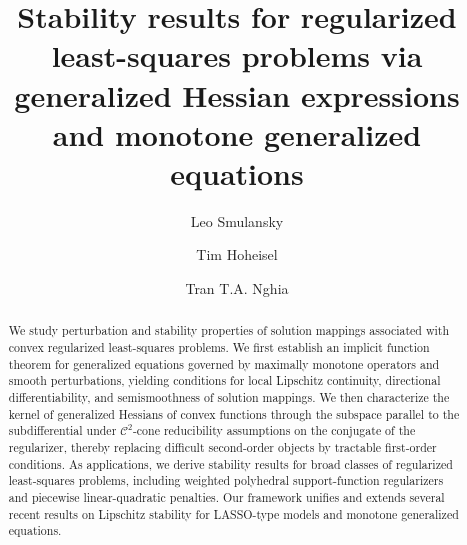 \documentclass[reqno]{amsart}
\numberwithin{equation}{section}
\begin{document}
\title[Stability results for regularized least-squares problems]{Stability results for regularized least-squares problems via  generalized Hessian expressions and monotone generalized equations}




\author{Leo Smulansky}
\address{
Department of Mathematics and Statistics\\
McGill University\\
Burnside Hall\\
805 Sherbrooke Street West\\
Montreal, Quebec H3A 0B9\\
Canada
}


\address{
Department of Mathematics and Statistics\\
McGill University\\
Burnside Hall, Room 1114\\
805 Sherbrooke Street West\\
Montreal, Quebec H3A 0B9\\
Canada
}

\author{Tim Hoheisel}

\author{Tran T.A. Nghia}
\address{
Department of Mathematics and Statistics\\
Oakland University\\
444 Mathematics and Science Center\\
Rochester, MI 48309\\
USA
}





\begin{abstract}
We study perturbation and stability properties of solution mappings associated with convex regularized least-squares problems. 
We first establish an implicit function theorem for generalized equations governed by maximally monotone operators and smooth perturbations, yielding conditions for local Lipschitz continuity, directional differentiability, and semismoothness of solution mappings. We then characterize the kernel of generalized Hessians of convex functions through the subspace parallel to the subdifferential under \(\mathcal{C}^2\)-cone reducibility assumptions  on the conjugate of the regularizer, thereby replacing difficult second-order objects by tractable first-order conditions. As applications, we derive stability results for broad classes of regularized least-squares problems, including weighted polyhedral support-function regularizers and piecewise linear-quadratic penalties. Our framework unifies and extends several recent results on Lipschitz stability for LASSO-type models and monotone generalized equations.
\end{abstract}
\end{document}
